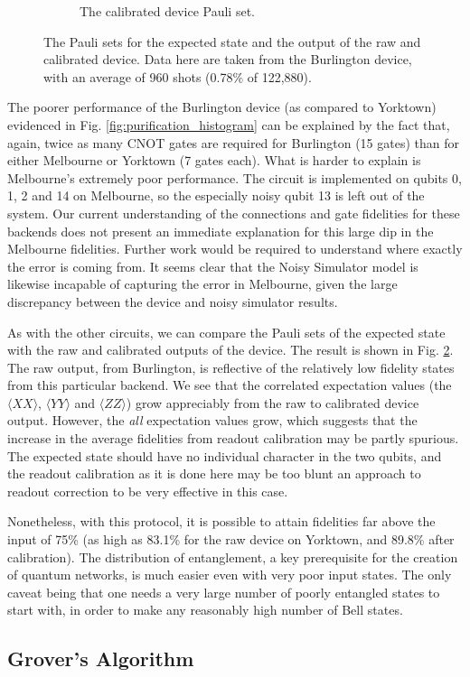 \begin{figure}[h!]
\begin{subfigure}{.5\textwidth}
		\caption{The calibrated device Pauli set.}
		\label{fig:pur_pauli_cal}
	\end{subfigure}
	\caption{The Pauli sets for the expected state and the output of the raw and
    calibrated device. Data here are taken from the Burlington device, with an
    average of 960 shots (0.78\% of 122,880).}
	\label{fig:purification_paulis}
\end{figure}

The poorer performance of the Burlington device (as compared to Yorktown)
evidenced in Fig. \ref{fig:purification_histogram} can be explained by the fact
that, again, twice as many CNOT gates are required for Burlington (15 gates)
than for either Melbourne or Yorktown (7 gates each). What is harder to explain
is Melbourne's extremely poor performance. The circuit is implemented on qubits
0, 1, 2 and 14 on Melbourne, so the especially noisy qubit 13 is left out of the
system. Our current understanding of the connections and gate fidelities for
these backends does not present an immediate explanation for this large dip in
the Melbourne fidelities. Further work would be required to understand where
exactly the error is coming from. It seems clear that the Noisy Simulator model
is likewise incapable of capturing the error in Melbourne, given the large
discrepancy between the device and noisy simulator results.

As with the other circuits, we can compare the Pauli sets of the expected state
with the raw and calibrated outputs of the device. The result is shown in Fig.
\ref{fig:purification_paulis}. The raw output, from Burlington, is reflective of
the relatively low fidelity states from this particular backend. We see that the
correlated expectation values (the $\langle XX \rangle$, $\langle YY \rangle$
and $\langle ZZ \rangle$) grow appreciably from the raw to calibrated device
output. However, the \textit{all} expectation values grow, which suggests that
the increase in the average fidelities from readout calibration may be partly
spurious. The expected state should have no individual character in the two
qubits, and the readout calibration as it is done here may be too blunt an
approach to readout correction to be very effective in this case.

Nonetheless, with this protocol, it is possible to attain fidelities far above
the input of 75\% (as high as 83.1\% for the raw device on Yorktown, and 89.8\%
after calibration). The distribution of entanglement, a key prerequisite for the
creation of quantum networks, is much easier even with very poor input states.
The only caveat being that one needs a very large number of poorly entangled
states to start with, in order to make any reasonably high number of Bell states.

\subsection{Grover's Algorithm}


